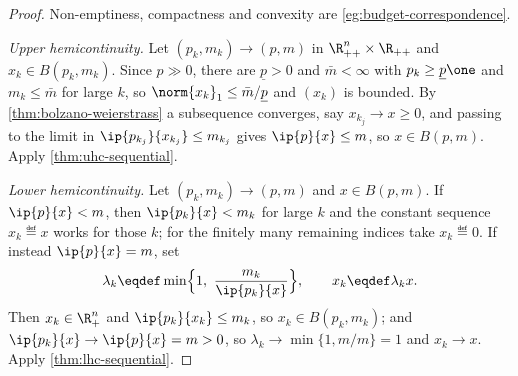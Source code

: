 \begin{proof}
	Non-emptiness, compactness and convexity are \autoref{eg:budget-correspondence}.

	\emph{Upper hemicontinuity.} Let $(p_k,m_k)\to(p,m)$ in
	$\R^{n}_{++}\times\R_{++}$ and $x_k\in B(p_k,m_k)$. Since $p\gg0$, there are
	$\underline{p}>0$ and $\bar m<\infty$ with $p_k\geq\underline{p}\one$ and
	$m_k\leq\bar m$ for large $k$, so
	$\norm{x_k}_1\leq\bar m/\underline{p}$ and $(x_k)$ is bounded. By
	\autoref{thm:bolzano-weierstrass} a subsequence converges, say
	$x_{k_j}\to x\geq0$, and passing to the limit in
	$\ip{p_{k_j}}{x_{k_j}}\leq m_{k_j}$ gives $\ip{p}{x}\leq m$, so
	$x\in B(p,m)$. Apply \autoref{thm:uhc-sequential}.

	\emph{Lower hemicontinuity.} Let $(p_k,m_k)\to(p,m)$ and
	$x\in B(p,m)$. If $\ip{p}{x}<m$, then $\ip{p_k}{x}<m_k$ for large $k$ and the
	constant sequence $x_k\eqdef x$ works for those $k$; for the finitely many
	remaining indices take $x_k\eqdef0$. If instead $\ip{p}{x}=m$, set
	\[
		\lambda_k\eqdef\min\Bigl\{1,\ \frac{m_k}{\ip{p_k}{x}}\Bigr\},
		\qquad x_k\eqdef\lambda_kx .
	\]
	Then $x_k\in\R^n_+$ and $\ip{p_k}{x_k}\leq m_k$, so $x_k\in B(p_k,m_k)$; and
	$\ip{p_k}{x}\to\ip{p}{x}=m>0$, so $\lambda_k\to\min\{1,m/m\}=1$ and
	$x_k\to x$. Apply \autoref{thm:lhc-sequential}.
\end{proof}

